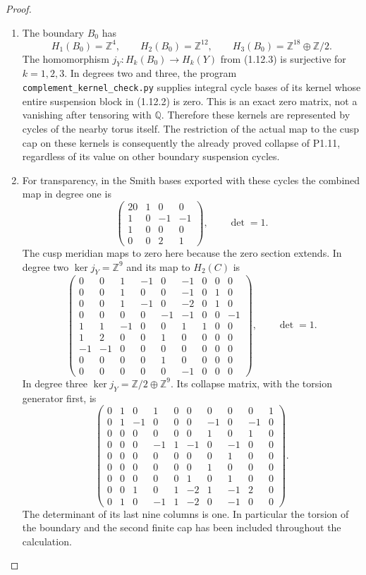 \begin{proof}
\begin{enumerate}[label=\arabic*.]
\item The boundary $B_0$ has
\[
H_1(B_0)=\mathbb Z^4,\qquad H_2(B_0)=\mathbb Z^{12},\qquad
H_3(B_0)=\mathbb Z^{18}\oplus\mathbb Z/2.
\]
The homomorphism $j_Y:H_k(B_0)\to H_k(Y)$ from (1.12.3) is
surjective for $k=1,2,3$.  In degrees two and three, the program
\texttt{complement\_kernel\_check.py} supplies integral cycle bases
of its kernel whose entire suspension block in (1.12.2) is zero.
This is an exact zero matrix, not a vanishing after tensoring with
$\mathbb Q$.  Therefore these kernels are represented by cycles of
the nearby torus itself.  The restriction of the actual map to the
cusp cap on these kernels is consequently the already proved
collapse of P1.11, regardless of its value on other boundary
suspension cycles.

\item For transparency, in the Smith bases exported with these cycles the
combined map in degree one is
\[
\begin{pmatrix}20&1&0&0\\1&0&-1&-1\\1&0&0&0\\0&0&2&1\end{pmatrix},
\qquad\det=1.
\tag{1.12.7}
\]
The cusp meridian maps to zero here because the zero section extends.
In degree two $\ker j_Y=\mathbb Z^9$ and its map to $H_2(C)$ is
\[
\begin{pmatrix}
0&0&1&-1&0&-1&0&0&0\\
0&0&1&0&0&-1&0&1&0\\
0&0&1&-1&0&-2&0&1&0\\
0&0&0&0&-1&-1&0&0&-1\\
1&1&-1&0&0&1&1&0&0\\
1&2&0&0&1&0&0&0&0\\
-1&-1&0&0&0&0&0&0&0\\
0&0&0&0&1&0&0&0&0\\
0&0&0&0&0&-1&0&0&0
\end{pmatrix},\qquad\det=1.
\tag{1.12.8}
\]
In degree three $\ker j_Y=\mathbb Z/2\oplus\mathbb Z^9$.
Its collapse matrix, with the torsion generator first, is
\[
\begin{pmatrix}
0&1&0&1&0&0&0&0&0&1\\
0&1&-1&0&0&0&-1&0&-1&0\\
0&0&0&0&0&0&1&0&1&0\\
0&0&0&-1&1&-1&0&-1&0&0\\
0&0&0&0&0&0&0&1&0&0\\
0&0&0&0&0&0&1&0&0&0\\
0&0&0&0&0&1&0&1&0&0\\
0&0&1&0&1&-2&1&-1&2&0\\
0&1&0&-1&1&-2&0&-1&0&0
\end{pmatrix}.
\tag{1.12.9}
\]
The determinant of its last nine columns is one.  In particular the
torsion of the boundary and the second finite cap has been included
throughout the calculation.


\end{enumerate}
\end{proof}
